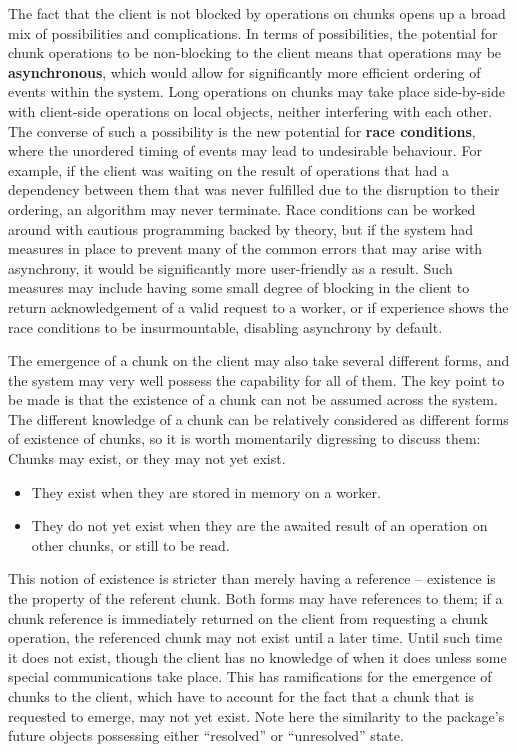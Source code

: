 The fact that the client is not blocked by operations on chunks opens up a broad mix of possibilities and complications.
In terms of possibilities, the potential for chunk operations to be non-blocking to the client means that operations may be \textbf{asynchronous}, which would allow for significantly more efficient ordering of events within the system.
Long operations on chunks may take place side-by-side with client-side operations on local objects, neither interfering with each other.
The converse of such a possibility is the new potential for \textbf{race conditions}, where the unordered timing of events may lead to undesirable behaviour.
For example, if the client was waiting on the result of operations that had a dependency between them that was never fulfilled due to the disruption to their ordering, an algorithm may never terminate.
Race conditions can be worked around with cautious programming backed by theory, but if the system had measures in place to prevent many of the common errors that may arise with asynchrony, it would be significantly more user-friendly as a result.
Such measures may include having some small degree of blocking in the client to return acknowledgement of a valid request to a worker, or if experience shows the race conditions to be insurmountable, disabling asynchrony by default.

The emergence of a chunk on the client may also take several different forms, and the system may very well possess the capability for all of them.
The key point to be made is that the existence of a chunk can not be assumed across the system.
The different knowledge of a chunk can be relatively considered as different forms of existence of chunks, so it is worth momentarily digressing to discuss them: Chunks may exist, or they may not yet exist.

\begin{itemize}
	\item
	      They exist when they are stored in memory on a worker.
	\item
	      They do not yet exist when they are the awaited result of an operation
	      on other chunks, or still to be read.
\end{itemize}

This notion of existence is stricter than merely having a reference -- existence is the property of the referent chunk.
Both forms may have references to them; if a chunk reference is immediately returned on the client from requesting a chunk operation, the referenced chunk may not exist until a later time.
Until such time it does not exist, though the client has no knowledge of when it does unless some special communications take place.
This has ramifications for the emergence of chunks to the client, which have to account for the fact that a chunk that is requested to emerge, may not yet exist.
Note here the similarity to the  package's future objects possessing either ``resolved'' or ``unresolved'' state.

